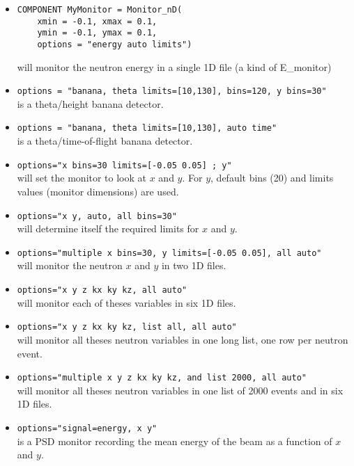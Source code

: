\begin{itemize}
\item{
\begin{verbatim}
COMPONENT MyMonitor = Monitor_nD(
    xmin = -0.1, xmax = 0.1,
    ymin = -0.1, ymax = 0.1,
    options = "energy auto limits")
\end{verbatim}
will monitor the neutron energy in a single 1D file (a kind of E\_monitor)}
\item{\texttt{options = "banana, theta limits=[10,130], bins=120, y bins=30"} \\
    is a theta/height banana detector.}
\item{\texttt{options = "banana, theta limits=[10,130], auto time"} \\
    is a theta/time-of-flight banana detector.}

\item{\texttt{options="x bins=30 limits=[-0.05 0.05] ; y"} \\
    will set the monitor to look at $x$ and $y$. For $y$, default bins (20)
    and limits values (monitor dimensions) are used.}

\item{\texttt{options="x y, auto, all bins=30"} \\
    will determine itself the required limits for $x$ and $y$.}

\item{\texttt{options="multiple x bins=30, y limits=[-0.05 0.05], all auto"} \\
will monitor the neutron $x$ and $y$ in two 1D files.}
\item{\texttt{options="x y z kx ky kz, all auto"} \\
will monitor each of theses variables in six 1D files.}
\item{\texttt{options="x y z kx ky kz, list all, all auto"} \\
will monitor all theses neutron variables in one long list, one row per neutron event.}
\item{\texttt{options="multiple x y z kx ky kz, and list 2000, all auto"} \\
    will monitor all theses neutron variables in one list of 2000 events
    and in six 1D files.}
\item{\texttt{options="signal=energy, x y"} \\
    is a PSD monitor recording the mean energy of the beam as a function of $x$ and $y$.}
\end{itemize}

